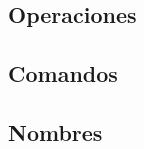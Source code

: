 \subsection*{Operaciones}


\subsection*{Comandos}


\subsection*{Nombres}






























